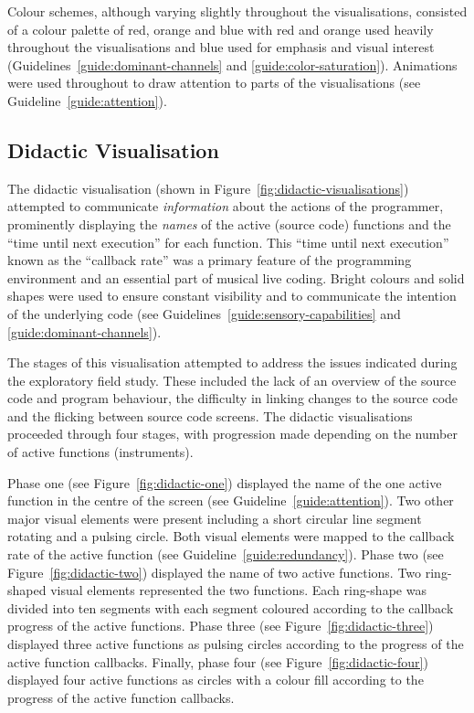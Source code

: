 Colour schemes, although varying slightly throughout the visualisations, consisted of a colour palette of red, orange and blue with red and orange used heavily throughout the visualisations and blue used for emphasis and visual interest (Guidelines~\ref{guide:dominant-channels} and \ref{guide:color-saturation}). Animations were used throughout to draw attention to parts of the visualisations (see Guideline~\ref{guide:attention}).



\subsection{Didactic Visualisation}
\label{sec:didactic-visualisation}

The didactic visualisation (shown in Figure~\ref{fig:didactic-visualisations}) attempted to communicate \emph{information} about the actions of the programmer, prominently displaying the \emph{names} of the active (source code) functions and the ``time until next execution'' for each function. This ``time until next execution'' known as the ``callback rate'' was a primary feature of the programming environment and an essential part of musical live coding. Bright colours and solid shapes were used to ensure constant visibility and to communicate the intention of the underlying code (see Guidelines~\ref{guide:sensory-capabilities} and \ref{guide:dominant-channels}). 

The stages of this visualisation attempted to address the issues indicated during the exploratory field study. These included the lack of an overview of the source code and program behaviour, the difficulty in linking changes to the source code and the flicking between source code screens. The didactic visualisations proceeded through four stages, with progression made depending on the number of active functions (instruments).

Phase one (see Figure~\ref{fig:didactic-one}) displayed the name of the one active function in the centre of the screen (see Guideline~\ref{guide:attention}). Two other major visual elements were present including a short circular line segment rotating and a pulsing circle. Both visual elements were mapped to the callback rate of the active function (see Guideline~\ref{guide:redundancy}). Phase two (see Figure~\ref{fig:didactic-two}) displayed the name of two active functions. Two ring-shaped visual elements represented the two functions. Each ring-shape was divided into ten segments with each segment coloured according to the callback progress of the active functions. Phase three (see Figure~\ref{fig:didactic-three}) displayed three active functions as pulsing circles according to the progress of the active function callbacks. Finally, phase four (see Figure~\ref{fig:didactic-four}) displayed four active functions as circles with a colour fill according to the progress of the active function callbacks.

